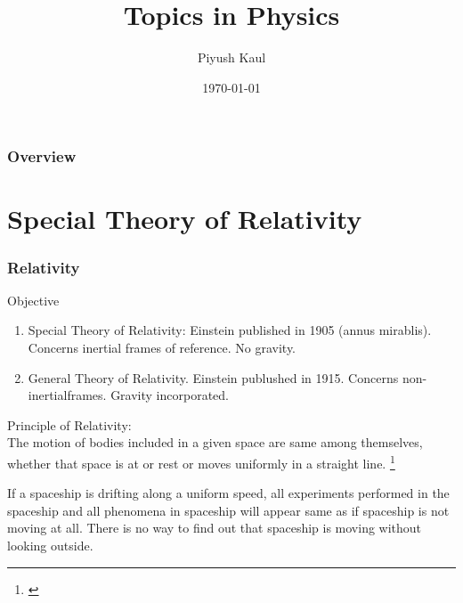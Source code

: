 \documentclass{beamer}
\title[Topics in Physics]{Topics in Physics} %
\author{Piyush Kaul } %
\institute[https://piyushkaul.github.io] %
	{
		\\ %
		\medskip
		\textit{piyushkaul@ieee.org} %
	}
\date{\today} %
\theoremstyle{plain}
\theoremstyle{definition}
\theoremstyle{remark}
\numberwithin{equation}{section}
\numberwithin{figure}{section}
\numberwithin{theorem}{section}
\begin{document}
		
		\begin{frame}
			\titlepage %
		\end{frame}
		
		\begin{frame}
			\frametitle{Overview} %
			\tableofcontents %
		\end{frame}
		
		
		\section{Special Theory of Relativity} %
		
		
		\begin{frame}[shrink]
			\frametitle{Relativity}
			Objective
			\begin{enumerate}
				\item Special Theory of Relativity: Einstein published in 1905 (annus mirablis). Concerns inertial frames of reference. No gravity.
				\item General Theory of Relativity. Einstein publushed in 1915. Concerns non-inertialframes. Gravity incorporated.
			\end{enumerate}
			\begin{definition}Principle of Relativity:\\
				The motion of bodies included in a given space are same among themselves, whether that space is at or rest or moves uniformly in a straight line.			\footnote[frame]{\cite{feynman1965}}
			\end{definition}
			\begin{example}
				If a spaceship is drifting along a uniform speed, all experiments performed in the spaceship and all phenomena in spaceship will appear same as if spaceship is not moving at all. There is no way to find out that spaceship is moving without looking outside.
			\end{example}
		\end{frame}
	
\end{document}
